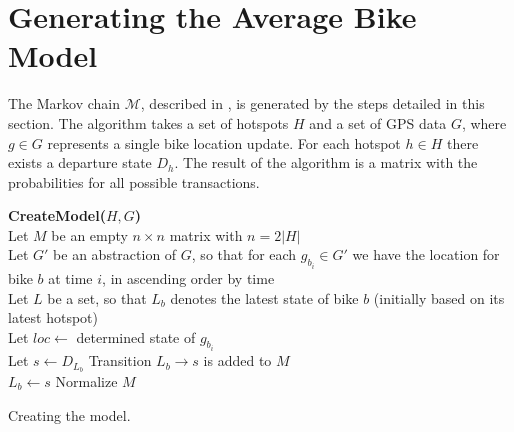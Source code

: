 \section{Generating the Average Bike Model}\label{sec:generatemarkov}
The Markov chain $\mathcal{M}$, described in , is generated by the steps detailed in this section.
The algorithm takes a set of hotspots $H$ and a set of GPS data $G$, where $g \in G$ represents a single bike location update. For each hotspot $h \in H$ there exists a departure state $D_h$.
The result of the algorithm is a matrix with the probabilities for all possible transactions.

\begin{algorithm}[H]
\SetAlgoNoEnd
\textbf{CreateModel($H, G$)} \\
Let $M$ be an empty $n \times n$ matrix with $n = 2|H|$ \\
Let $G'$ be an abstraction of $G$, so that for each $g_{b_i} \in G'$ we have the location for bike $b$ at time $i$, in ascending order by time\\
Let $L$ be a set, so that $L_b$ denotes the latest state of bike $b$ (initially based on its latest hotspot)\\
    {Let $loc \leftarrow $ determined state of $g_{b_i}$\\
      {Let $s \leftarrow D_{L_b}$}
    Transition $L_b \rightarrow s$ is added to $M$\\
     $L_b \leftarrow s$}
Normalize $M$\\
\caption{Creating the model.}
\label{markov:create_model}
\end{algorithm}
